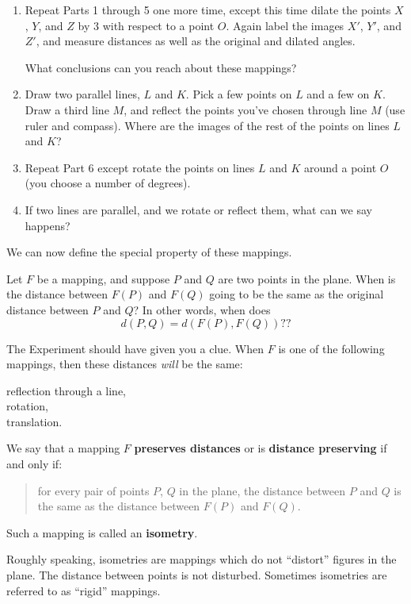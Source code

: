 \documentclass[12pt]{book} %
\begin{document}
\begin{ExerciseList}
\begin{enumerate}
\item Repeat Parts 1 through 5 one more time, except this time dilate the points $X$, $Y$, and $Z$ by 3 with respect to a point $O$. Again label the images $X'$, $Y'$, and $Z'$, and measure distances as well as the original and dilated angles.

What conclusions can you reach about these mappings?

\item Draw two parallel lines, $L$ and $K$. Pick a few points on $L$ and a few on $K$. Draw a third line $M$, and reflect the points you've chosen through line $M$ (use ruler and compass). Where are the images of the rest of the points on lines $L$ and $K$?

\item Repeat Part 6 except rotate the points on lines $L$ and $K$ around a point $O$ (you choose a number of degrees).

\item If two lines are parallel, and we rotate or reflect them, what can we say happens?
\end{enumerate}

We can now define the special property of these mappings.

Let $F$ be a mapping, and suppose $P$ and $Q$ are two points in the plane. When is the distance between $F(P)$ and $F(Q)$ going to be the same as the original distance between $P$ and $Q$? In other words, when does
\[
d(P,Q)=d(F(P),F(Q))??
\]

The Experiment should have given you a clue. When $F$ is one of the following mappings, then these distances \textit{will} be the same:
\begin{center}
reflection through a line,\\
rotation,\\
translation.
\end{center}

We say that a mapping $F$ \textbf{preserves distances} or is \textbf{distance preserving} if and only if:

\begin{quote}
for every pair of points $P$, $Q$ in the plane, the distance between $P$ and $Q$ is the same as the distance between $F(P)$ and $F(Q)$.
\end{quote}

Such a mapping is called an \textbf{isometry}.

Roughly speaking, isometries are mappings which do not ``distort'' figures in the plane. The distance between points is not disturbed. Sometimes isometries are referred to as ``rigid'' mappings.


\end{ExerciseList}
\end{document}
